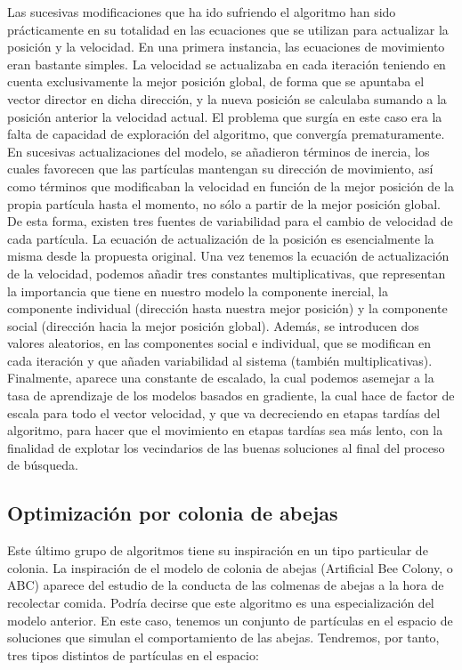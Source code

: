 \documentclass[
  a4paper,
,tablecaptionabove
]{scrartcl}
\begin{document}
Las sucesivas modificaciones que ha ido sufriendo el algoritmo han sido
prácticamente en su totalidad en las ecuaciones que se utilizan para
actualizar la posición y la velocidad. En una primera instancia, las
ecuaciones de movimiento eran bastante simples. La velocidad se
actualizaba en cada iteración teniendo en cuenta exclusivamente la mejor
posición global, de forma que se apuntaba el vector director en dicha
dirección, y la nueva posición se calculaba sumando a la posición
anterior la velocidad actual. El problema que surgía en este caso era la
falta de capacidad de exploración del algoritmo, que convergía
prematuramente. En sucesivas actualizaciones del modelo, se añadieron
términos de inercia, los cuales favorecen que las partículas mantengan
su dirección de movimiento, así como términos que modificaban la
velocidad en función de la mejor posición de la propia partícula hasta
el momento, no sólo a partir de la mejor posición global. De esta forma,
existen tres fuentes de variabilidad para el cambio de velocidad de cada
partícula. La ecuación de actualización de la posición es esencialmente
la misma desde la propuesta original. Una vez tenemos la ecuación de
actualización de la velocidad, podemos añadir tres constantes
multiplicativas, que representan la importancia que tiene en nuestro
modelo la componente inercial, la componente individual (dirección hasta
nuestra mejor posición) y la componente social (dirección hacia la mejor
posición global). Además, se introducen dos valores aleatorios, en las
componentes social e individual, que se modifican en cada iteración y
que añaden variabilidad al sistema (también multiplicativas).
Finalmente, aparece una constante de escalado, la cual podemos asemejar
a la tasa de aprendizaje de los modelos basados en gradiente, la cual
hace de factor de escala para todo el vector velocidad, y que va
decreciendo en etapas tardías del algoritmo, para hacer que el
movimiento en etapas tardías sea más lento, con la finalidad de explotar
los vecindarios de las buenas soluciones al final del proceso de
búsqueda.

\hypertarget{optimizaciuxf3n-por-colonia-de-abejas}{%
\subsection{Optimización por colonia de
abejas}\label{optimizaciuxf3n-por-colonia-de-abejas}}

Este último grupo de algoritmos tiene su inspiración en un tipo
particular de colonia. La inspiración de el modelo de colonia de abejas
(Artificial Bee Colony, o ABC) aparece del estudio de la conducta de las
colmenas de abejas a la hora de recolectar comida. Podría decirse que
este algoritmo es una especialización del modelo anterior. En este caso,
tenemos un conjunto de partículas en el espacio de soluciones que
simulan el comportamiento de las abejas. Tendremos, por tanto, tres
tipos distintos de partículas en el espacio:
\end{document}
